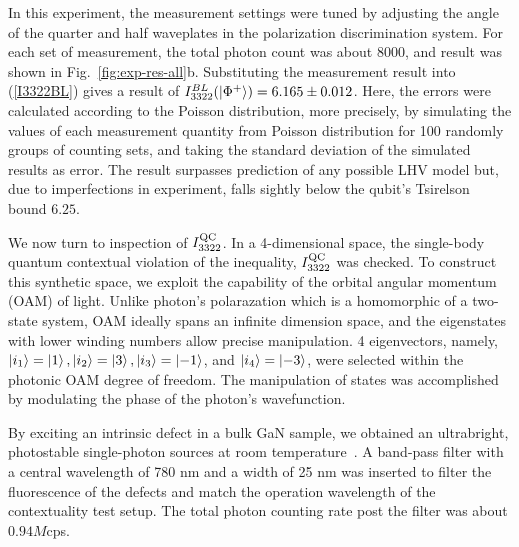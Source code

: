 \documentclass[prl,letterpaper,english,reprint,nofootinbib,aps,superscriptaddress,showpacs,showkeys]{revtex4-1}
\theoremstyle{definition}
\theoremstyle{remark}
\begin{document}
 In this experiment, the measurement settings were tuned by adjusting the angle of the quarter and half waveplates in the polarization discrimination system. For each set of measurement, the total photon count was about $8000$, and result was shown in Fig.~\ref{fig:exp-res-all}b. Substituting the measurement result into (\ref{I3322BL}) gives a result of $I_{3322}^{BL}(\ket{\Phi^+})=6.165 \pm 0.012$. Here, the errors were calculated according to the Poisson distribution, more precisely, by simulating the values of each measurement quantity from Poisson distribution for 100 randomly groups of counting sets, and taking the standard deviation of the simulated results as error. The result surpasses prediction of any possible LHV model but, due to imperfections in experiment, falls sightly below the qubit's Tsirelson bound $6.25$.

 We now turn to inspection of $I_{3322}^{\rm QC}$. In a 4-dimensional space, the single-body quantum contextual violation of the inequality, $I_{3322}^{\rm QC}$ was checked.
 To construct this synthetic space, we exploit the capability of the orbital angular momentum (OAM) of light. Unlike photon's polarazation which is a homomorphic of a two-state system, OAM ideally spans an infinite dimension space, and the eigenstates with lower winding numbers allow precise manipulation. 
 4 eigenvectors, namely, $\ket{i_1} = \ket{1}, \ket{i_2} = \ket{3}, \ket{i_3} = \ket{-1}$, and $\ket{i_4} = \ket{-3}$, were selected within the photonic OAM degree of freedom. The manipulation of states was accomplished by modulating the phase of the photon's wavefunction.

 By exciting an intrinsic defect in a bulk GaN sample, we obtained an ultrabright, photostable single-photon sources at room temperature~\cite{qli18}. 
 A band-pass filter with a central wavelength of 780 nm and a width of 25 nm was inserted to filter the fluorescence of the defects and match the operation wavelength of the contextuality test setup. The total photon counting rate post the filter was about $0.94M$cps.
\end{document}
